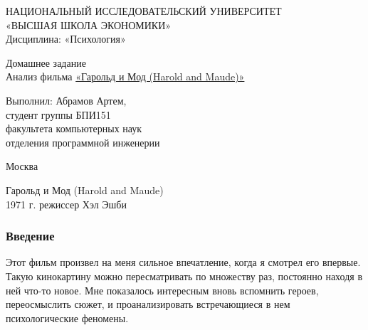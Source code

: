 \documentclass[a4paper,12pt]{report} %
\begin{document}
\begin{titlepage}

\newpage

\begin{center}

{\large 
НАЦИОНАЛЬНЫЙ ИССЛЕДОВАТЕЛЬСКИЙ УНИВЕРСИТЕТ \\
«ВЫСШАЯ ШКОЛА ЭКОНОМИКИ» 	\\
Дисциплина: «Психология» 	\\
}

\vfill %

{\large 
	Домашнее задание \\
	Анализ фильма \underline{«Гарольд и Мод (Harold and Maude)»} 	\\
}

\bigskip

\vfill

\begin{flushright}
Выполнил: Абрамов Артем,\\
студент группы БПИ151 \\
факультета компьютерных наук \\
отделения программной инженерии \\
\end{flushright}

\vfill

Москва \number\year

\end{center}
\end{titlepage}

\newpage


\begin{center}
{\normalsize
 	Гарольд и Мод (Harold and Maude) \\
 	1971 г. режиссер Хэл Эшби \\
}
\end{center}

\subsubsection{Введение}

Этот фильм произвел на меня сильное впечатление, когда я смотрел его впервые. Такую кинокартину можно пересматривать по множеству раз, постоянно находя в ней что-то новое. Мне показалось интересным вновь вспомнить героев, переосмыслить сюжет, и проанализировать встречающиеся в нем психологические феномены.
\end{document}
